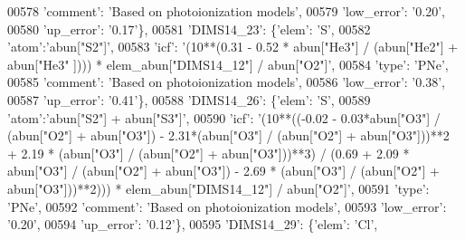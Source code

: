 \begin{DoxyCode}
00578                                        \textcolor{stringliteral}{'comment'}: \textcolor{stringliteral}{'Based on photoionization models'},
00579                                        \textcolor{stringliteral}{'low\_error'}: \textcolor{stringliteral}{'0.20'},
00580                                        \textcolor{stringliteral}{'up\_error'}: \textcolor{stringliteral}{'0.17'}\},
00581                          \textcolor{stringliteral}{'DIMS14\_23'}: \{\textcolor{stringliteral}{'elem'}: \textcolor{stringliteral}{'S'},
00582                                        \textcolor{stringliteral}{'atom'}:\textcolor{stringliteral}{'abun["S2"]'}, 
00583                                        \textcolor{stringliteral}{'icf'}: \textcolor{stringliteral}{'(10**(0.31 - 0.52 * abun["He3"] / (abun["He2"] + abun["He3"
      ]))) * elem\_abun["DIMS14\_12"] / abun["O2"]'},
00584                                        \textcolor{stringliteral}{'type'}: \textcolor{stringliteral}{'PNe'},
00585                                        \textcolor{stringliteral}{'comment'}: \textcolor{stringliteral}{'Based on photoionization models'},
00586                                        \textcolor{stringliteral}{'low\_error'}: \textcolor{stringliteral}{'0.38'},
00587                                        \textcolor{stringliteral}{'up\_error'}: \textcolor{stringliteral}{'0.41'}\},
00588                          \textcolor{stringliteral}{'DIMS14\_26'}: \{\textcolor{stringliteral}{'elem'}: \textcolor{stringliteral}{'S'},
00589                                        \textcolor{stringliteral}{'atom'}:\textcolor{stringliteral}{'abun["S2"] + abun["S3"]'}, 
00590                                        \textcolor{stringliteral}{'icf'}: \textcolor{stringliteral}{'(10**((-0.02 - 0.03*abun["O3"] / (abun["O2"] + abun["O3"]) -
       2.31*(abun["O3"] / (abun["O2"] + abun["O3"]))**2 + 2.19 * (abun["O3"] / (abun["O2"] + abun["O3"]))**3) /
       (0.69 + 2.09 * abun["O3"] / (abun["O2"] + abun["O3"]) - 2.69 * (abun["O3"] / (abun["O2"] + abun["O3"]))**2)))
       * elem\_abun["DIMS14\_12"] / abun["O2"]'},
00591                                        \textcolor{stringliteral}{'type'}: \textcolor{stringliteral}{'PNe'},
00592                                        \textcolor{stringliteral}{'comment'}: \textcolor{stringliteral}{'Based on photoionization models'},
00593                                        \textcolor{stringliteral}{'low\_error'}: \textcolor{stringliteral}{'0.20'},
00594                                        \textcolor{stringliteral}{'up\_error'}: \textcolor{stringliteral}{'0.12'}\},
00595                          \textcolor{stringliteral}{'DIMS14\_29'}: \{\textcolor{stringliteral}{'elem'}: \textcolor{stringliteral}{'Cl'},

\end{DoxyCode}
